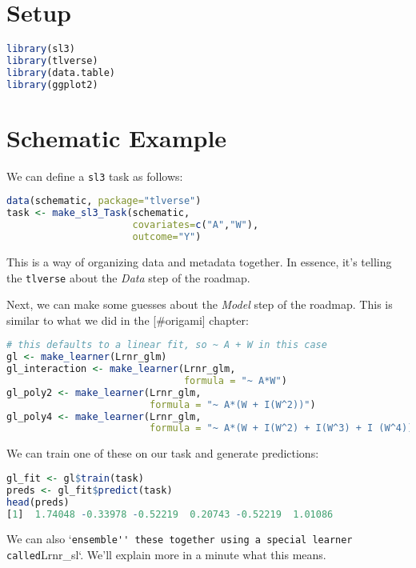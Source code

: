 \documentclass[
  12pt, krantz2,
]{krantz}
\newcommand{\passthrough}[1]{#1}
\theoremstyle{definition}
\theoremstyle{definition}
\theoremstyle{definition}
\newcommand{\1}{\mathbbm{1}}
\begin{document}
\hypertarget{setup-1}{%
\section{Setup}\label{setup-1}}

\begin{lstlisting}[language=R]
library(sl3)
library(tlverse)
library(data.table)
library(ggplot2)
\end{lstlisting}

\hypertarget{schematic-example-2}{%
\section{Schematic Example}\label{schematic-example-2}}

We can define a \passthrough{\lstinline!sl3!} task as follows:

\begin{lstlisting}[language=R]
data(schematic, package="tlverse")
task <- make_sl3_Task(schematic, 
                      covariates=c("A","W"),
                      outcome="Y")
\end{lstlisting}

This is a way of organizing data and metadata together. In essence, it's telling
the \passthrough{\lstinline!tlverse!} about the \emph{Data} step of the roadmap.

Next, we can make some guesses about the \emph{Model} step of the roadmap. This is
similar to what we did in the {[}\#origami{]} chapter:

\begin{lstlisting}[language=R]
# this defaults to a linear fit, so ~ A + W in this case
gl <- make_learner(Lrnr_glm)
gl_interaction <- make_learner(Lrnr_glm, 
                               formula = "~ A*W")
gl_poly2 <- make_learner(Lrnr_glm, 
                         formula = "~ A*(W + I(W^2))")
gl_poly4 <- make_learner(Lrnr_glm, 
                         formula = "~ A*(W + I(W^2) + I(W^3) + I (W^4))")
\end{lstlisting}

We can train one of these on our task and generate predictions:

\begin{lstlisting}[language=R]
gl_fit <- gl$train(task)
preds <- gl_fit$predict(task)
head(preds)
[1]  1.74048 -0.33978 -0.52219  0.20743 -0.52219  1.01086
\end{lstlisting}

We can also `\passthrough{\lstinline!ensemble'' these together using a special learner called!}Lrnr\_sl`.
We'll explain more in a minute what this means.
\end{document}
